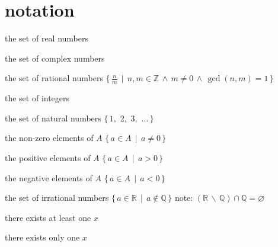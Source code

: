 \documentclass{article}
\newcommand{\nullset}{\varnothing}
\newcommand{\spaced}[1]{\, #1 \,}
\newcommand{\scomp}{\spaced{\backslash}}
\newcommand{\sland}{\spaced{\land}}
\newcommand{\buildset}[2]{\{\spaced{#1} \mid \spaced{#2} \}}
\newcommand{\finiteset}[3]{\{ \spaced{#1,} \spaced{#2,} \spaced{#3,} \spaced{\dots} \}}
\begin{document}
    \maketitle
    \tableofcontents
    \newpage
    \section{notation}
        \vspace{1em}
        \begin{notation}[$\mathbb{R}$]
            the set of real numbers
        \end{notation}
        \begin{notation}[$\mathbb{C}$]
            the set of complex numbers
        \end{notation}
        \begin{notation}[$\mathbb{Q}$]
            the set of rational numbers \tab\tab $\buildset{\frac{n}{m}}{n, m \in \mathbb{Z} \sland m \not= 0 \sland \gcd(n, m) = 1}$
        \end{notation}
        \begin{notation}[$\mathbb{Z}$]
            the set of integers
        \end{notation}
        \begin{notation}[$\mathbb{N}$]
            the set of natural numbers \tab\tab $\finiteset{1}{2}{3}$
        \end{notation}
        \begin{notation}[$A^*$]
            the non-zero elements of $A$ \tab\tab $\buildset{a \in A}{a \not= 0}$
        \end{notation}
        \begin{notation}[$A^+$]
            the positive elements of $A$ \tab\tab
            $\buildset{a \in A}{a > 0}$
        \end{notation}
        \begin{notation}[$A^-$]
            the negative elements of $A$ \tab\tab
            $\buildset{a \in A}{a < 0}$
        \end{notation}
        \begin{notation}[$\mathbb{R} \scomp \mathbb{Q}$]
            the set of irrational numbers \tab\tab $\buildset{a \in \mathbb{R}}{a \notin \mathbb{Q}}$
            \tab note: $(\mathbb{R} \scomp \mathbb{Q}) \cap \mathbb{Q} = \nullset$
        \end{notation}
        \begin{notation}[$\exists x$]
            there exists at least one $x$
        \end{notation}
        \begin{notation}[$\exists 'x$]
            there exists only one $x$
        \end{notation}
    
\end{document}
